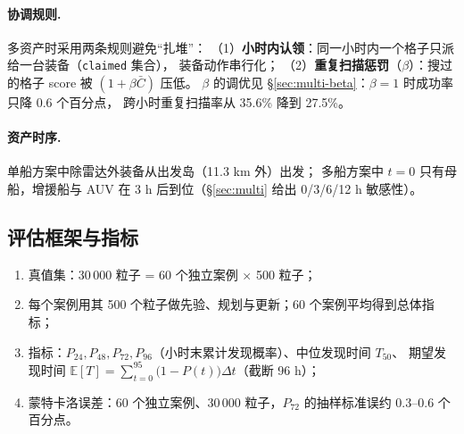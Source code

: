 \paragraph{协调规则.} 多资产时采用两条规则避免“扎堆”：
（1）\textbf{小时内认领}：同一小时内一个格子只派给一台装备（\texttt{claimed} 集合），
装备动作串行化；
（2）\textbf{重复扫描惩罚}（$\beta$）：搜过的格子 score 被 $(1+\beta\bar C)$ 压低。
$\beta$ 的调优见 §\ref{sec:multi-beta}：$\beta=1$ 时成功率只降 0.6 个百分点，
跨小时重复扫描率从 35.6\% 降到 27.5\%。

\paragraph{资产时序.} 单船方案中除雷达外装备从出发岛（11.3 km 外）出发；
多船方案中 $t=0$ 只有母船，增援船与 AUV 在 3 h 后到位（§\ref{sec:multi} 给出
0/3/6/12 h 敏感性）。

\subsection{评估框架与指标}

\begin{enumerate}[leftmargin=1.8em,itemsep=0pt]
\item 真值集：30\,000 粒子 = 60 个独立案例 $\times$ 500 粒子；
\item 每个案例用其 500 个粒子做先验、规划与更新；60 个案例平均得到总体指标；
\item 指标：$P_{24},P_{48},P_{72},P_{96}$（小时末累计发现概率）、中位发现时间 $T_{50}$、
      期望发现时间 $\mathbb E[T]=\sum_{t=0}^{95}\bigl(1-P(t)\bigr)\Delta t$（截断 96 h）；
\item 蒙特卡洛误差：60 个独立案例、30\,000 粒子，$P_{72}$ 的抽样标准误约
      $0.3$--$0.6$ 个百分点。
\end{enumerate}
